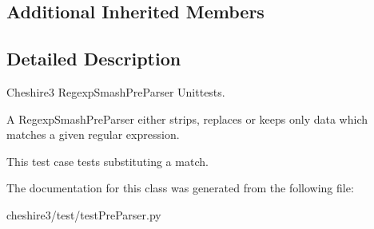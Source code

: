 \subsection*{Additional Inherited Members}


\subsection{Detailed Description}
\begin{DoxyVerb}Cheshire3 RegexpSmashPreParser Unittests.

A RegexpSmashPreParser either strips, replaces or keeps only data which 
matches a given regular expression.

This test case tests substituting a match.
\end{DoxyVerb}
 

The documentation for this class was generated from the following file\-:\begin{DoxyCompactItemize}
\item 
cheshire3/test/test\-Pre\-Parser.\-py\end{DoxyCompactItemize}
